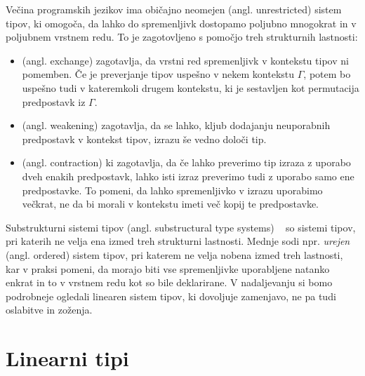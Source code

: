 Večina programskih jezikov ima običajno neomejen (angl. unrestricted) sistem tipov, ki omogoča, da lahko do spremenljivk dostopamo poljubno mnogokrat in v poljubnem vrstnem redu. To je zagotovljeno s pomočjo treh strukturnih lastnosti:
\begin{itemize}
    \itemsep 0em
    \item {} (angl. exchange) zagotavlja, da vrstni red spremenljivk v kontekstu tipov ni pomemben. Če je preverjanje tipov uspešno v nekem kontekstu $\Gamma$, potem bo uspešno tudi v kateremkoli drugem kontekstu, ki je sestavljen kot permutacija predpostavk iz $\Gamma$.
    \item {} (angl. weakening) zagotavlja, da se lahko, kljub dodajanju neuporabnih predpostavk v kontekst tipov, izrazu še vedno določi tip.
    \item {} (angl. contraction) ki zagotavlja, da če lahko preverimo tip izraza z uporabo dveh enakih predpostavk, lahko isti izraz preverimo tudi z uporabo samo ene predpostavke. To pomeni, da lahko spremenljivko v izrazu uporabimo večkrat, ne da bi morali v kontekstu imeti več kopij te predpostavke.
\end{itemize}

Substrukturni sistemi tipov (angl. substructural type systems) ~\cite{pierce2004advanced} so sistemi tipov, pri katerih ne velja ena izmed treh strukturni lastnosti. Mednje sodi npr. \textit{urejen} (angl. ordered) sistem tipov, pri katerem ne velja nobena izmed treh lastnosti, kar v praksi pomeni, da morajo biti vse spremenljivke uporabljene natanko enkrat in to v vrstnem redu kot so bile deklarirane. V nadaljevanju si bomo podrobneje ogledali linearen sistem tipov, ki dovoljuje zamenjavo, ne pa tudi oslabitve in zoženja.

\section{Linearni tipi}
\label{sec:linearni-tipi}


